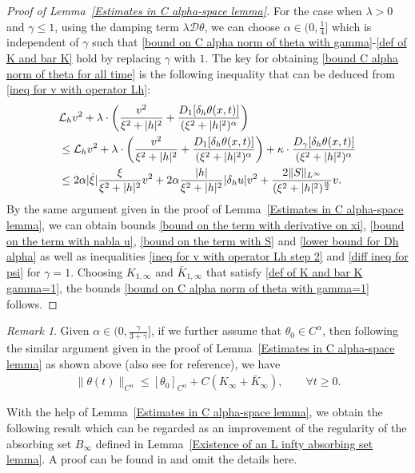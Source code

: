 \documentclass[reqno]{amsart}%
\theoremstyle{definition}
\theoremstyle{remark}
\numberwithin{equation}{section}
\newtheorem{remark}[theorem]{Remark}
\newcommand{\bK}{\bar{K}_{\infty}}
\newcommand{\Dh}{\delta_{h}}
\newcommand{\1}{\mathbf{1}}
\newcommand{\Lh}{\mathcal{L}_{h}}
\newcommand{\K}{K_{\infty}}
\numberwithin{equation}{section}
\numberwithin{theorem}{section}
\numberwithin{figure}{section}
\begin{document}
\begin{proof}[Proof of Lemma~\ref{Estimates in C alpha-space lemma}]
For the case when $\lambda>0$ and $\gamma\le1$, using the damping term $\lambda\mathcal{D}\theta$, we can choose $\alpha\in(0,\frac{1}{4}]$ which is independent of $\gamma$ such that \eqref{bound on C alpha norm of theta with gamma}-\eqref{def of K and bar K} hold by replacing $\gamma$ with $1$. The key for obtaining \eqref{bound C alpha norm of theta for all time} is the following inequality that can be deduced from \eqref{ineq for v with operator Lh}:
\begin{align*}
&\Lh v^2+\lambda\cdot\left(\frac{v^2}{\xi^2+|h|^2}+\frac{D_{1}[\Dh\theta(x,t)]}{(\xi^2+|h|^2)^\alpha}\right)\notag\\
&\le\Lh v^2+\lambda\cdot\left(\frac{v^2}{\xi^2+|h|^2}+\frac{D_{1}[\Dh\theta(x,t)]}{(\xi^2+|h|^2)^\alpha}\right)+\kappa\cdot\frac{D_{\gamma}[\Dh\theta(x,t)]}{(\xi^2+|h|^2)^\alpha}\notag\\
&\le 2\alpha|\dot{\xi}|\frac{\xi}{\xi^2+|h|^2}v^2+2\alpha\frac{|h|}{\xi^2+|h|^2}|\Dh u|v^2+\frac{2\|S\|_{L^\infty}}{(\xi^2+|h|^2)^\frac{\alpha}{2}}v.
\end{align*}
By the same argument given in the proof of Lemma~\ref{Estimates in C alpha-space lemma}, we can obtain bounds \eqref{bound on the term with derivative on xi}, \eqref{bound on the term with nabla u}, \eqref{bound on the term with S} and  \eqref{lower bound for Dh alpha} as well as inequalities \eqref{ineq for v with operator Lh step 2} and \eqref{diff ineq for psi} for $\gamma=1$. Choosing $K_{1,\infty}$ and $\bar{K}_{1,\infty}$ that satisfy \eqref{def of K and bar K gamma=1}, the bounds \eqref{bound on C alpha norm of theta with gamma=1} follows.
\end{proof}

\begin{remark}
Given $\alpha\in(0,\frac{\gamma}{3+\gamma}]$, if we further assume that $\theta_0\in C^{\alpha}$, then following the similar argument given in the proof of Lemma~\ref{Estimates in C alpha-space lemma} as shown above (also see \cite{CTV14} for reference), we have
\begin{align}\label{bound C alpha norm of theta for all time}
\|\theta(t)\|_{C^\alpha}\le [\theta_0]_{C^\alpha}+C(\K+\bK),\qquad\forall t\ge0.
\end{align}
\end{remark}

With the help of Lemma~\ref{Estimates in C alpha-space lemma}, we obtain the following result which can be regarded as an improvement of the regularity of the absorbing set $B_{\infty}$ defined in Lemma~\ref{Existence of an L infty absorbing set lemma}. A proof can be found in \cite{FS21} and omit the details here.
\end{document}
